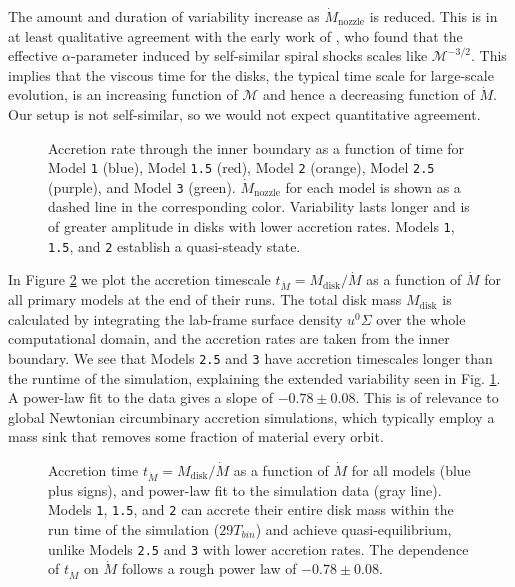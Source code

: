 \documentclass{emulateapj}
\newcommand{\al}{\alpha}
\newcommand{\Sig}{\Sigma}
\newcommand{\model}[1]{{Model \texttt{#1}}}
\begin{document}
The amount and duration of variability increase as $\dot{M}_\text{nozzle}$ is reduced.  This is in at least qualitative agreement with the early work of \cite{Spruit87}, who found that the effective $\al$-parameter induced by self-similar spiral shocks scales like $\mathcal{M}^{-3/2}$.  This implies that the viscous time for the disks, the typical time scale for large-scale evolution, is an increasing function of $\mathcal{M}$ and hence a decreasing function of $\dot{M}$.  Our setup is not self-similar, so we would not expect quantitative agreement.

\begin{figure}
\caption{\label{fi:mdot_all} Accretion rate through the inner boundary as a function of time for \model{1} (blue), \model{1.5} (red), \model{2} (orange), \model{2.5} (purple), and \model{3} (green).  $\dot{M}_\text{nozzle}$ for each model is shown as a dashed line in the corresponding color. Variability lasts longer and is of greater amplitude in disks with lower accretion rates.  Models \texttt{1}, \texttt{1.5}, and \texttt{2} establish a quasi-steady state.}
\end{figure}

In Figure \ref{fi:tacc} we plot the accretion timescale $t_{\dot{M}} = M_\text{disk} / \dot{M}$ as a function of $\dot{M}$ for all primary models at the end of their runs.  The total disk mass $M_\text{disk}$ is calculated by integrating the lab-frame surface density $u^0 \Sig$ over the whole computational domain, and the accretion rates are taken from the inner boundary.  We see that Models \texttt{2.5} and \texttt{3} have accretion timescales longer than the runtime of the simulation, explaining the extended variability seen in Fig. \ref{fi:mdot_all}.  A power-law fit to the data gives a slope of $-0.78 \pm 0.08$. This is of relevance to global Newtonian circumbinary accretion simulations, which typically employ a mass sink that removes some fraction of material every orbit.

\begin{figure}
\caption{\label{fi:tacc} Accretion time $t_{\dot{M}}=M_\text{disk}/\dot{M}$ as a function of $\dot{M}$ for all models (blue plus signs), and power-law fit to the simulation data (gray line).  Models \texttt{1}, \texttt{1.5}, and \texttt{2} can accrete their entire disk mass within the run time of the simulation ($29 T_{bin}$) and achieve quasi-equilibrium, unlike Models \texttt{2.5} and \texttt{3} with lower accretion rates. The dependence of $t_{\dot{M}}$ on $\dot{M}$ follows a rough power law of $-0.78 \pm 0.08$.}
\end{figure}
\end{document}
